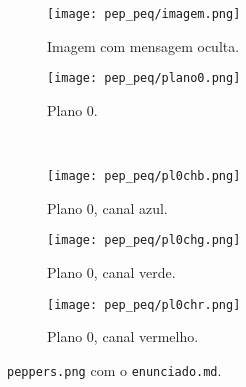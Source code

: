 \begin{figure}[H]
    \centering
    \begin{subfigure}{0.4\textwidth}
        \centering
        \texttt{[image: pep\_peq/imagem.png]}
        \caption{Imagem com mensagem oculta.}
        \label{fig:pequeno:imagem}
    \end{subfigure}%
    \begin{subfigure}{0.4\textwidth}
        \centering
        \texttt{[image: pep\_peq/plano0.png]}
        \caption{Plano 0.}
        \label{fig:pequeno:plano}
    \end{subfigure}\\[8pt]
    \begin{subfigure}{0.28\textwidth}
        \centering
        \texttt{[image: pep\_peq/pl0chb.png]}
        \caption{Plano 0, canal azul.}
        \label{fig:pequeno:blue}
    \end{subfigure}%
    \begin{subfigure}{0.28\textwidth}
        \centering
        \texttt{[image: pep\_peq/pl0chg.png]}
        \caption{Plano 0, canal verde.}
        \label{fig:pequeno:green}
    \end{subfigure}%
    \begin{subfigure}{0.28\textwidth}
        \centering
        \texttt{[image: pep\_peq/pl0chr.png]}
        \caption{Plano 0, canal vermelho.}
        \label{fig:pequeno:red}
    \end{subfigure}%

    \caption{\texttt{peppers.png} com o \texttt{enunciado.md}.}
    \label{fig:pequeno}
\end{figure}